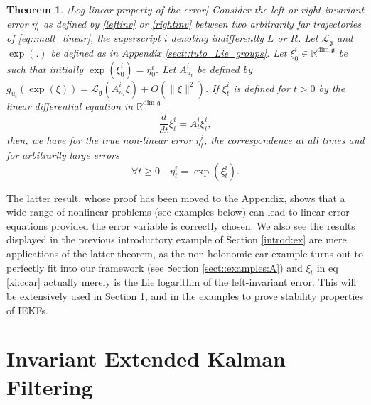 \documentclass[a4paper,12pt,onecolumn]{article}
\newtheorem{thm}{Theorem}
\newcommand{\RR}{{\mathbb{R}}}
\newcommand{\norm}[1]{\lVert#1\rVert}
\newcommand{\dotex}{{\frac{d}{dt}}}
\begin{document}
\begin{thm}\label{dechire:thm}[Log-linear property of the error]
Consider the left or right invariant error $\eta_t^i$ as defined by \eqref{leftinv} or \eqref{rightinv} between two arbitrarily far  trajectories of \eqref{eq::mult_linear}, the superscript  $i$ denoting indifferently $L$ or $R$. Let $\mathcal{L}_{\mathfrak{g}}$ and $\exp(.)$ be defined as in Appendix \ref{sect::tuto_Lie_groups}. Let $\xi_0^i\in\RR^{\text{dim }\mathfrak  g}$ be such that initially $\exp(\xi_0^i)=\eta_0^i$. Let $A_{u_t}^i$ be  defined by $g_{u_t}(\exp(\xi)) = \mathcal{L}_{\mathfrak{g}}(A_{u_t}^i \xi) + O(\norm{\xi}^2)$. If $\xi_t^i$ is defined for $t>0$ by the \emph{linear} differential equation in  $\RR^{\text{dim } \mathfrak g}$
\begin{equation}
\label{eq::def_xi}
\dotex \xi_t^i=A_t^i\xi_t^i,
\end{equation}
\emph{then}, we have for the true non-linear error $\eta_t^i$, the correspondence \emph{at all times} and for arbitrarily large errors 
$$
\forall t\geq 0\quad \eta_t^i=\exp(\xi_t^i).
$$
 \end{thm}The latter result, whose proof has been moved to the Appendix, shows that a wide range of nonlinear problems (see examples below) can lead to linear error equations provided the error variable is correctly chosen.  We also see the results displayed in the previous introductory example of Section \ref{introd:ex} are mere applications of the latter theorem, as the non-holonomic car example turns out to perfectly fit into our framework (see Section \ref{sect::examples:A}) and  $\xi_t$ in eq \eqref{xi:ccar} actually  merely is the Lie logarithm of the left-invariant error.   
 This will be extensively used in Section \ref{sect::IEKF}, and in the examples to prove stability properties of IEKFs.













\section{Invariant Extended Kalman Filtering}
\label{sect::IEKF}
\end{document}
